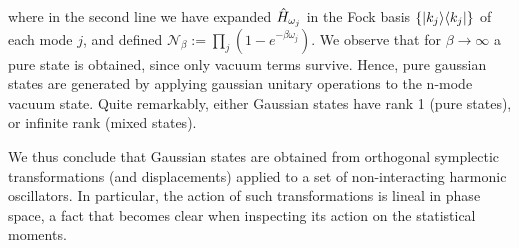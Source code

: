 where in the second line we have expanded $\hat{H}_{\omega_j}$ in the Fock basis $\llaves{\proj{k_j}}$ of each mode $j$, and defined $\mathcal{N}_\beta  := \prod_j (1-e^{-\beta \omega_j})$. We observe that for $\beta \rightarrow \infty$ a pure state is obtained, since only vacuum terms survive. Hence, pure gaussian states are generated by applying gaussian unitary operations to the n-mode vacuum state. Quite remarkably, either Gaussian states have rank 1 (pure states), or infinite rank (mixed states).

We thus conclude that Gaussian states are obtained from orthogonal symplectic transformations (and displacements) applied to a set of non-interacting harmonic oscillators. In particular, the action of such transformations is lineal in phase space, a fact that becomes clear when inspecting its action on the statistical moments.
